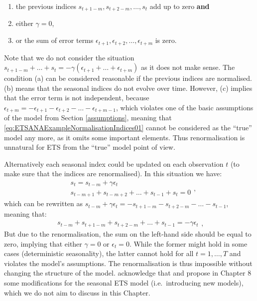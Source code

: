 \documentclass[]{book}
\providecommand{\tightlist}{%
  \setlength{\itemsep}{0pt}\setlength{\parskip}{0pt}}
\theoremstyle{definition}
\theoremstyle{definition}
\theoremstyle{definition}
\theoremstyle{definition}
\theoremstyle{remark}
\begin{document}
\begin{enumerate}
\def\labelenumi{\alph{enumi}.}
\tightlist
\item
  the previous indices \(s_{t+1-m}, s_{t+2-m}, \dots, s_{t}\) add up to zero \textbf{and}
\item
  either \(\gamma=0\),
\item
  or the sum of error terms \(\epsilon_{t+1}, \epsilon_{t+2}, \dots, \epsilon_{t+m}\) is zero.
\end{enumerate}

Note that we do not consider the situation \(s_{t+1-m}+ \dots+ s_{t} = -\gamma \left(\epsilon_{t+1}+ \dots+ \epsilon_{t+m}\right)\) as it does not make sense. The condition (a) can be considered reasonable if the previous indices are normalised. (b) means that the seasonal indices do not evolve over time. However, (c) implies that the error term is not independent, because \(\epsilon_{t+m} = -\epsilon_{t+1}- \epsilon_{t+2}- \dots- \epsilon_{t+m-1}\), which violates one of the basic assumptions of the model from Section \ref{assumptions}, meaning that \eqref{eq:ETSANAExampleNormalisationIndices01} cannot be considered as the ``true'' model any more, as it omits some important elements. Thus renormalisation is unnatural for ETS from the ``true'' model point of view.

Alternatively each seasonal index could be updated on each observation \(t\) (to make sure that the indices are renormalised). In this situation we have:
\begin{equation*}
  \begin{aligned}
  &s_t = s_{t-m} + \gamma\epsilon_t \\
  &s_{t-m+1}+ s_{t-m+2}+ \dots+ s_{t-1} + s_{t} = 0
  \end{aligned},
\end{equation*}
which can be rewritten as \(s_{t-m} + \gamma\epsilon_t = -s_{t+1-m}- s_{t+2-m}- \dots- s_{t-1}\), meaning that:
\begin{equation*}
  \begin{aligned}
  s_{t-m}+ s_{t+1-m}+ s_{t+2-m}+ \dots+ s_{t-1} = -\gamma\epsilon_t
  \end{aligned},
\end{equation*}
But due to the renormalisation, the sum on the left-hand side should be equal to zero, implying that either \(\gamma=0\) or \(\epsilon_t=0\). While the former might hold in some cases (deterministic seasonality), the latter cannot hold for all \(t=1,\dots,T\) and violates the model's assumptions. The renormalisation is thus impossible without changing the structure of the model. \citet{Hyndman2008b} acknowledge that and propose in Chapter 8 some modifications for the seasonal ETS model (i.e.~introducing new models), which we do not aim to discuss in this Chapter.
\end{document}
